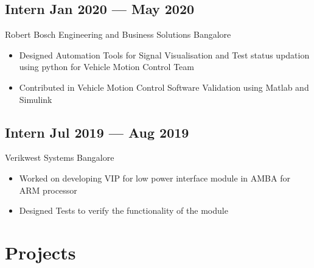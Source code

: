 \documentclass[a4,10pt]{article}
\newcommand{\subtext}[1]{
#1\par\vspace{-0.2cm}}
\newenvironment{zitemize}{
\begin{itemize}\itemsep0pt \parskip0pt \parsep1pt}
{\end{itemize}\vspace{-0.5cm}}
\begin{document}
\subsection*{Intern \hfill Jan 2020 --- May 2020} 
\subtext{Robert Bosch Engineering and Business Solutions \hfill Bangalore} 
    \begin{zitemize}
        \item Designed Automation Tools for Signal Visualisation and Test status updation using python for Vehicle Motion Control Team 
        \item Contributed in Vehicle Motion Control Software Validation using Matlab and Simulink
    \end{zitemize}
    
\subsection*{Intern \hfill Jul 2019 --- Aug 2019} 
\subtext{Verikwest Systems  \hfill Bangalore} 
    \begin{zitemize}
        \item Worked on developing VIP for low power interface module in AMBA for ARM processor
        \item Designed Tests to verify the functionality of the module
        
    \end{zitemize}




\section{Projects} %

\end{document}

